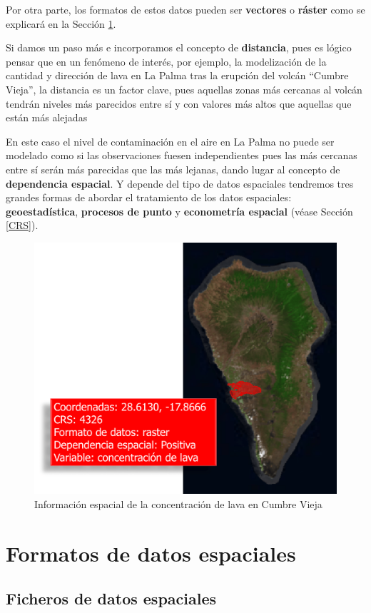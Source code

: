 \documentclass[
]{book}
\theoremstyle{definition}
\theoremstyle{definition}
\theoremstyle{definition}
\theoremstyle{definition}
\theoremstyle{remark}
\begin{document}
Por otra parte, los formatos de estos datos pueden ser \textbf{vectores} o \textbf{ráster}
como se explicará en la Sección \ref{formatos}.

Si damos un paso más e incorporamos el concepto de \textbf{distancia}, pues es lógico
pensar que en un fenómeno de interés, por ejemplo, la modelización de la
cantidad y dirección de lava en La Palma tras la erupción del volcán ``Cumbre
Vieja'', la distancia es un factor clave, pues aquellas zonas más cercanas al
volcán tendrán niveles más parecidos entre sí y con valores más altos que
aquellas que están más alejadas

En este caso el nivel de contaminación en el aire en La Palma no puede ser
modelado como si las observaciones fuesen independientes pues las más cercanas
entre sí serán más parecidas que las más lejanas, dando lugar al concepto de
\textbf{dependencia espacial}. Y depende del tipo de datos espaciales tendremos tres
grandes formas de abordar el tratamiento de los datos espaciales:
\textbf{geoestadística}, \textbf{procesos de punto} y \textbf{econometría espacial} (véase
Sección \ref{CRS}).

\begin{figure}

{\centering \includegraphics[width=0.6\linewidth]{img/Cumbrevieja} 

}

\caption{Información espacial de la concentración de lava en Cumbre Vieja}\label{fig:gis}
\end{figure}

\hypertarget{formatos}{%
\chapter{Formatos de datos espaciales}\label{formatos}}

\hypertarget{ficheros-de-datos-espaciales}{%
\section{Ficheros de datos espaciales}\label{ficheros-de-datos-espaciales}}
\end{document}

